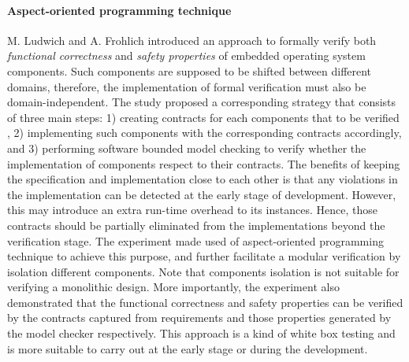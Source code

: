 

\paragraph{Aspect-oriented programming technique} M. Ludwich and A. Frohlich \cite{Ludwich:2013:FVC:2433140.2433148} introduced an approach to formally verify both \textit{functional correctness} and \textit{safety properties} of embedded operating system components. Such components are supposed to be shifted between different domains, therefore, the implementation of formal verification must also be domain-independent. The study proposed a corresponding strategy that consists of three main steps: 1) creating contracts for each components that to be verified , 2) implementing such components with the corresponding contracts accordingly, and 3) performing software bounded model checking to verify whether the implementation of components respect to their contracts. The benefits of keeping the specification and implementation close to each other is that any violations in the implementation can be detected at the early stage of development. However, this may introduce an extra run-time overhead to its instances. Hence, those contracts should be partially eliminated from the implementations beyond the verification stage. The experiment made used of aspect-oriented programming technique to achieve this purpose, and further facilitate a modular verification by isolation different components. Note that components isolation is not suitable for verifying a monolithic design. More importantly, the experiment also demonstrated that the functional correctness and safety properties can be verified by the contracts captured from requirements and those properties generated by the model checker respectively. This approach is a kind of white box testing and is more suitable to carry out at the early stage or during the development.

